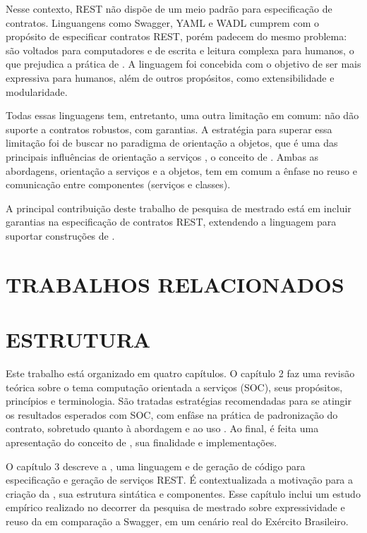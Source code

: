 Nesse contexto, REST não dispõe de um meio padrão para especificação de
contratos. Linguangens como Swagger, YAML e WADL cumprem com o propósito de
especificar contratos REST, porém padecem do mesmo problema: são voltados para
computadores e de escrita e leitura complexa para humanos, o que
prejudica a prática de \CtFirst{}. A linguagem \neoidl{} foi concebida com o objetivo de ser mais
expressiva para humanos, além de outros propósitos, como extensibilidade e
modularidade.

Todas essas linguagens tem, entretanto, uma outra limitação em comum: não dão
suporte a contratos robustos, com garantias. A estratégia para superar essa
limitação foi de buscar no paradigma de orientação a objetos, que é uma das
principais influências de orientação a serviços \cite{erl2009web},
o conceito de \designbycontract{}. Ambas as abordagens, orientação a serviços e
a objetos, tem em comum a ênfase no reuso e comunicação entre componentes
(serviços e classes).

A principal contribuição deste trabalho de
pesquisa de mestrado está em incluir garantias na especificação de
contratos REST, extendendo a linguagem \neoidl{} para suportar construções de
\designbycontract{}.


\section{TRABALHOS RELACIONADOS}
\vspace{-6mm}


\section{ESTRUTURA}
\vspace{-6mm}

Este trabalho está organizado em quatro capítulos. O capítulo 2 faz uma revisão
teórica sobre o tema computação orientada a serviços (SOC), seus propósitos,
princípios e terminologia. São tratadas estratégias recomendadas para se
atingir os resultados esperados com SOC, com enfâse na prática de padronização
do contrato, sobretudo quanto à abordagem \CtFirst{} e ao uso \wss{}. Ao final,
é feita uma apresentação do conceito de \designbycontract{}, sua finalidade e
implementações.

O capítulo 3 descreve a \neoidl{}, uma linguagem e \framework{} de geração de
código para especificação e geração de serviços REST. É contextualizada a
motivação para a criação da \neoidl{}, sua estrutura sintática e componentes.
Esse capítulo inclui um estudo empírico realizado no decorrer da pesquisa
de mestrado sobre expressividade e reuso da \neoidl{} em comparação a Swagger,
em um cenário real do Exército Brasileiro.

